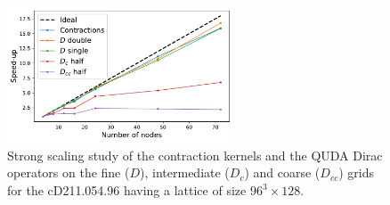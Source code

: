 \begin{figure}
	\includegraphics[width=0.6\textwidth]{plots/speedup.pdf}
	\caption{Strong scaling study of the contraction kernels and the QUDA Dirac operators on the fine ($D$), intermediate ($D_c$) and coarse ($D_{cc}$) grids for the cD211.054.96 having a lattice of size $96^3\times128$.}
	\label{fig:quda_dirac_strong}
\end{figure}

